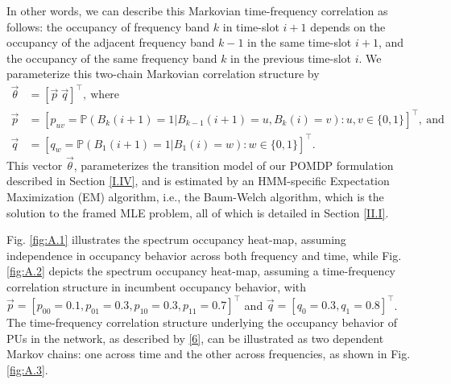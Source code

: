 \documentclass[12pt, draftcls, onecolumn]{IEEEtran}
\begin{document}
In other words, we can describe this Markovian time-frequency correlation as follows: the occupancy of frequency band $k$ in time-slot $i+1$ depends on the occupancy of the adjacent frequency band $k-1$ in the same time-slot $i+1$, and the occupancy of the same frequency band $k$ in the previous time-slot $i$. We parameterize this two-chain Markovian correlation structure by
\begin{equation}\label{7}
    \begin{aligned}
        \vec{\theta}&=[\vec{p}\ \vec{q}]^{\intercal},\ \text{where}\\
        \vec{p}&=[p_{uv}=\mathbb{P}(B_{k}(i+1)=1|B_{k-1}(i+1)=u,B_{k}(i)=v):u,v \in \{0,1\}]^{\intercal},\ \text{and}\\
        \vec{q}&=[q_{w}=\mathbb{P}(B_{1}(i+1)=1|B_{1}(i)=w):w \in \{0,1\}]^{\intercal}.
    \end{aligned}
\end{equation}
This vector $\vec{\theta}$, parameterizes the transition model of our POMDP formulation described in Section \ref{I.IV}, and is estimated by an HMM-specific Expectation Maximization (EM) algorithm, i.e., the Baum-Welch algorithm, which is the solution to the framed MLE problem, all of which is detailed in Section \ref{II.I}.

Fig. \ref{fig:A.1} illustrates the spectrum occupancy heat-map, assuming independence in occupancy behavior across both frequency and time, while Fig. \ref{fig:A.2} depicts the spectrum occupancy heat-map, assuming a time-frequency correlation structure in incumbent occupancy behavior, with $\vec{p}{=}[p_{00}{=}0.1,p_{01}{=}0.3,p_{10}{=}0.3,p_{11}{=}0.7]^{\intercal}$ and $\vec{q}=[q_{0}{=}0.3,q_{1}{=}0.8]^{\intercal}$. The time-frequency correlation structure underlying the occupancy behavior of PUs in the network, as described by \eqref{6}, can be illustrated as two dependent Markov chains: one across time and the other across frequencies, as shown in Fig. \ref{fig:A.3}.
\end{document}
